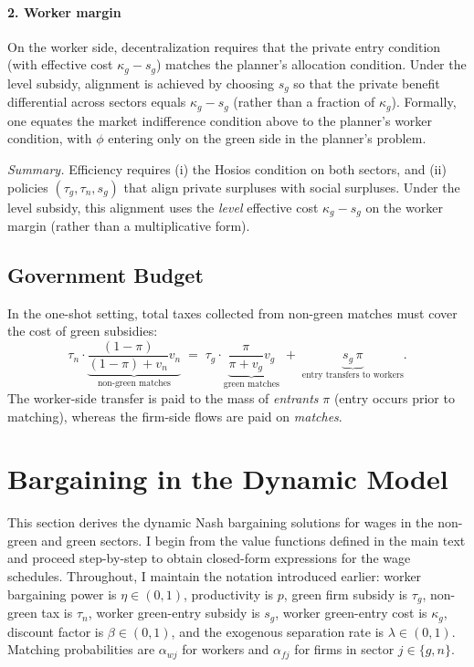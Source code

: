 \documentclass[preprint,12pt]{elsarticle}
\begin{document}
\paragraph{2. Worker margin}  
On the worker side, decentralization requires that the private entry condition (with effective cost \(\kappa_g-s_g\)) matches the planner’s allocation condition. Under the level subsidy, alignment is achieved by choosing \(s_g\) so that the private benefit differential across sectors equals \(\kappa_g-s_g\) (rather than a fraction of \(\kappa_g\)). Formally, one equates the market indifference condition above to the planner’s worker condition, with \(\phi\) entering only on the green side in the planner’s problem.

\medskip
\noindent\emph{Summary.}  
Efficiency requires (i) the Hosios condition on both sectors, and (ii) policies \((\tau_g,\tau_n,s_g)\) that align private surpluses with social surpluses. Under the level subsidy, this alignment uses the \emph{level} effective cost \(\kappa_g-s_g\) on the worker margin (rather than a multiplicative form).

\subsection{Government Budget}

In the one-shot setting, total taxes collected from non-green matches must cover the cost of green subsidies:
\[
\tau_n \cdot \underbrace{\frac{(1 - \pi)}{(1 - \pi) + v_n} v_n}_{\text{non-green matches}}
\;=\;
\tau_g \cdot \underbrace{\frac{\pi}{\pi + v_g} v_g}_{\text{green matches}}
\;+\;
\underbrace{s_g\,\pi}_{\text{entry transfers to workers}}.
\]
The worker-side transfer is paid to the mass of \emph{entrants} \(\pi\) (entry occurs prior to matching), whereas the firm-side flows are paid on \emph{matches}.
\section{Bargaining in the Dynamic Model}
\label{app:dyn_bargaining}

This section derives the dynamic Nash bargaining solutions for wages in the non-green and green sectors. I begin from the value functions defined in the main text and proceed step-by-step to obtain closed-form expressions for the wage schedules. Throughout, I maintain the notation introduced earlier: worker bargaining power is \(\eta\in(0,1)\), productivity is \(p\), green firm subsidy is \(\tau_g\), non-green tax is \(\tau_n\), worker green-entry subsidy is \(s_g\), worker green-entry cost is \(\kappa_g\), discount factor is \(\beta\in(0,1)\), and the exogenous separation rate is \(\lambda\in(0,1)\). Matching probabilities are \(\alpha_{wj}\) for workers and \(\alpha_{fj}\) for firms in sector \(j\in\{g,n\}\).
\end{document}
